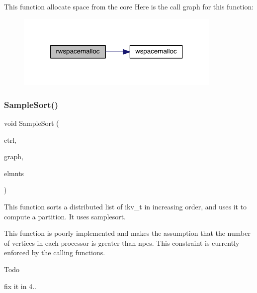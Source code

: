 This function allocate space from the core Here is the call graph for this function\+:\nopagebreak
\begin{figure}[H]
\begin{center}
\leavevmode
\includegraphics[width=280pt]{a00951_ad1c3f444b6873f0bfdb82e1bb98372d5_cgraph}
\end{center}
\end{figure}
\mbox{\label{a00951_abe4909937da2b634a792018173454529}} 
\subsubsection{\texorpdfstring{Sample\+Sort()}{SampleSort()}}
{\footnotesize\ttfamily void Sample\+Sort (\begin{DoxyParamCaption}\item[{\hyperlink{a00742}{ctrl\+\_\+t} $\ast$}]{ctrl,  }\item[{\hyperlink{a00734}{graph\+\_\+t} $\ast$}]{graph,  }\item[{ikv\+\_\+t $\ast$}]{elmnts }\end{DoxyParamCaption})}

This function sorts a distributed list of ikv\+\_\+t in increasing order, and uses it to compute a partition. It uses samplesort.

This function is poorly implemented and makes the assumption that the number of vertices in each processor is greater than npes. This constraint is currently enforced by the calling functions. \begin{DoxyRefDesc}{Todo}
\item[\hyperlink{a00626__todo000002}{Todo}]fix it in 4.. \end{DoxyRefDesc}
\mbox{\label{a00951_ad7879274a6b65a679f0b7acf7ab84ca0}} 
